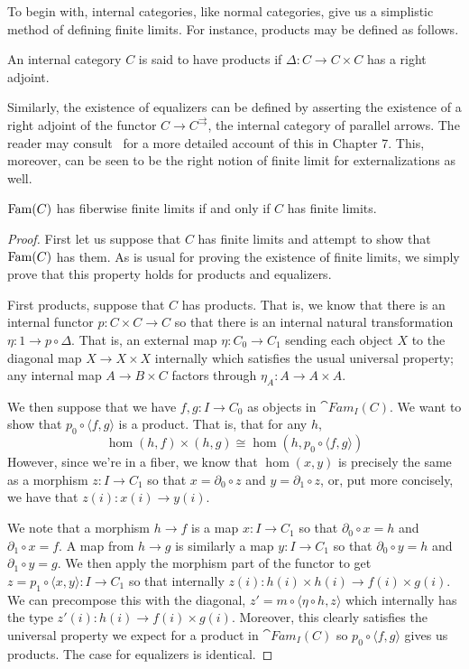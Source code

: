 To begin with, internal categories, like normal categories, give us a
simplistic method of defining finite limits. For instance, products
may be defined as follows.
\begin{defn}\label{defn:completeness:products}
  An internal category $C$ is said to have products if
  $\Delta : C \to C \times C$ has a right adjoint.
\end{defn}
Similarly, the existence of equalizers can be defined by asserting the
existence of a right adjoint of the functor
$C \to C^{\rightrightarrows}$, the internal category of parallel
arrows. The reader may consult~\citet{Jacobs:99} for a more detailed
account of this in Chapter 7. This, moreover, can be seen to be the
right notion of finite limit for externalizations as well.
\begin{thm}\label{defn:completeness:finlimexternalization}
  $\operatorname{Fam}(C)$ has fiberwise finite limits if and only if $C$ has
  finite limits.
\end{thm}
\begin{proof}
  First let us suppose that $C$ has finite limits and attempt to show
  that $\operatorname{Fam}(C)$ has them. As is usual for proving the existence of
  finite limits, we simply prove that this property holds for products
  and equalizers.

  First products, suppose that $C$ has products. That is, we know that
  there is an internal functor $p : C \times C \to C$ so that there is
  an internal natural transformation $\eta : 1 \to p \circ \Delta$.
  That is, an external map $\eta : C_0 \to C_1$ sending each object
  $X$ to the diagonal map $X \to X \times X$ internally which
  satisfies the usual universal property; any internal map
  $A \to B \times C$ factors through $\eta_A : A \to A \times A$.

  We then suppose that we have $f, g : I \to C_0$ as objects in
  $\cat{Fam}_I(C)$. We want to show that
  $p_0 \circ \langle f, g \rangle$ is a product. That is, that for any
  $h$,
  \[
    \hom(h, f) \times (h, g) \cong \hom(h, p_0 \circ \langle f, g \rangle)
  \]
  However, since we're in a fiber, we know that $\hom(x, y)$ is
  precisely the same as a morphism $z : I \to C_1$ so that
  $x = \partial_0 \circ z$ and $y = \partial_1 \circ z$, or, put more
  concisely, we have that $z(i) : x(i) \to y(i)$.

  We note that a morphism $h \to f$ is a map $x : I \to C_1$ so that
  $\partial_0 \circ x = h$ and $\partial_1 \circ x = f$. A map from
  $h \to g$ is similarly a map $y : I \to C_1$ so that
  $\partial_0 \circ y = h$ and $\partial_1 \circ y = g$. We then apply
  the morphism part of the functor to get
  $z = p_1 \circ \langle x, y \rangle : I \to C_1$ so that internally
  $z(i) : h(i) \times h(i) \to f(i) \times g(i)$. We can precompose
  this with the diagonal,
  $z' = m \circ \langle \eta \circ h, z \rangle$ which internally has
  the type $z'(i) : h(i) \to f(i) \times g(i)$. Moreover, this clearly
  satisfies the universal property we expect for a product in
  $\cat{Fam}_I(C)$ so $p_0 \circ \langle f, g \rangle$ gives us
  products. The case for equalizers is identical.
\end{proof}
